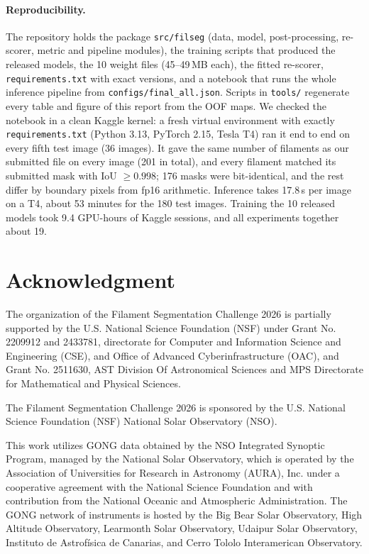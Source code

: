 \documentclass[sigconf]{acmart}
\begin{document}
\paragraph{Reproducibility.} The repository holds the package \texttt{src/filseg} (data, model, post-processing,
re-scorer, metric and pipeline modules), the training scripts that produced the released models, the 10 weight files
(45--49\,MB each), the fitted re-scorer, \texttt{requirements.txt} with exact versions, and a notebook that runs the whole
inference pipeline from \texttt{configs/\allowbreak{}final\_all.json}. Scripts in \texttt{tools/} regenerate every table and figure of
this report from the OOF maps. We checked the notebook in a clean Kaggle kernel: a fresh virtual environment with exactly
\texttt{requirements.txt} (Python 3.13, PyTorch 2.15, Tesla T4) ran it end to end on every fifth test image (36 images).
It gave the same number of filaments as our submitted file on every image (201 in total), and every filament matched its
submitted mask with IoU $\ge0.998$; 176 masks were bit-identical, and the rest differ by boundary pixels from fp16
arithmetic. Inference takes 17.8\,s per image on a T4, about 53 minutes for the 180 test images. Training the 10
released models took 9.4 GPU-hours of Kaggle sessions, and all experiments together about 19.

\section{Acknowledgment}\label{sec:acknowledgment}
    The organization of the Filament Segmentation Challenge 2026 is partially supported by the U.S. National Science Foundation (NSF) under Grant No. 2209912 and 2433781, directorate for Computer and Information Science and Engineering (CSE), and Office of Advanced Cyberinfrastructure (OAC), and Grant No. 2511630, AST Division Of Astronomical Sciences and MPS Directorate for Mathematical and Physical Sciences.

    The Filament Segmentation Challenge 2026 is sponsored by the U.S. National Science Foundation (NSF) National Solar Observatory (NSO).

    This work utilizes GONG data obtained by the NSO Integrated Synoptic Program, managed by the National Solar Observatory, which is operated by the Association of Universities for Research in Astronomy (AURA), Inc. under a cooperative agreement with the National Science Foundation and with contribution from the National Oceanic and Atmospheric Administration. The GONG network of instruments is hosted by the Big Bear Solar Observatory, High Altitude Observatory, Learmonth Solar Observatory, Udaipur Solar Observatory, Instituto de Astrofísica de Canarias, and Cerro Tololo Interamerican Observatory.



\end{document}
